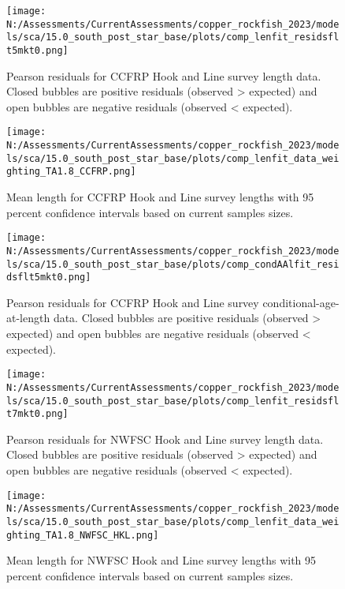 \documentclass[11pt,
  english,
  letterpaper,
]{article}
\begin{document}
\pagebreak

\begin{figure}
\centering
\texttt{[image: N:/Assessments/CurrentAssessments/copper\_rockfish\_2023/models/sca/15.0\_south\_post\_star\_base/plots/comp\_lenfit\_residsflt5mkt0.png]}
\caption{Pearson residuals for CCFRP Hook and Line survey length data. Closed bubbles are positive residuals (observed \textgreater{} expected) and open bubbles are negative residuals (observed \textless{} expected).\label{fig:ccfrp-len-pearson}}
\end{figure}

\pagebreak

\begin{figure}
\centering
\texttt{[image: N:/Assessments/CurrentAssessments/copper\_rockfish\_2023/models/sca/15.0\_south\_post\_star\_base/plots/comp\_lenfit\_data\_weighting\_TA1.8\_CCFRP.png]}
\caption{Mean length for CCFRP Hook and Line survey lengths with 95 percent confidence intervals based on current samples sizes.\label{fig:ccfrp-mean-len-fit}}
\end{figure}

\pagebreak

\begin{figure}
\centering
\texttt{[image: N:/Assessments/CurrentAssessments/copper\_rockfish\_2023/models/sca/15.0\_south\_post\_star\_base/plots/comp\_condAAlfit\_residsflt5mkt0.png]}
\caption{Pearson residuals for CCFRP Hook and Line survey conditional-age-at-length data. Closed bubbles are positive residuals (observed \textgreater{} expected) and open bubbles are negative residuals (observed \textless{} expected).\label{fig:ccfrp-age-pearson}}
\end{figure}

\pagebreak

\begin{figure}
\centering
\texttt{[image: N:/Assessments/CurrentAssessments/copper\_rockfish\_2023/models/sca/15.0\_south\_post\_star\_base/plots/comp\_lenfit\_residsflt7mkt0.png]}
\caption{Pearson residuals for NWFSC Hook and Line survey length data. Closed bubbles are positive residuals (observed \textgreater{} expected) and open bubbles are negative residuals (observed \textless{} expected).\label{fig:nwfsc-hkl-pearson}}
\end{figure}

\pagebreak

\begin{figure}
\centering
\texttt{[image: N:/Assessments/CurrentAssessments/copper\_rockfish\_2023/models/sca/15.0\_south\_post\_star\_base/plots/comp\_lenfit\_data\_weighting\_TA1.8\_NWFSC\_HKL.png]}
\caption{Mean length for NWFSC Hook and Line survey lengths with 95 percent confidence intervals based on current samples sizes.\label{fig:nwfsc-hkl-mean-len-fit}}
\end{figure}
\end{document}
